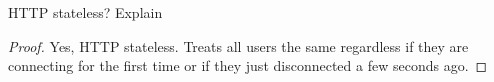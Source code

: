 \documentclass[./answersheet.tex]{subfiles}
\begin{document}
\begin{wts}
    HTTP stateless? Explain
\end{wts}
\begin{proof}
    Yes, HTTP stateless. Treats all users the same regardless if they are connecting for the first time or if they just disconnected a few seconds ago.
\end{proof}
\end{document}
